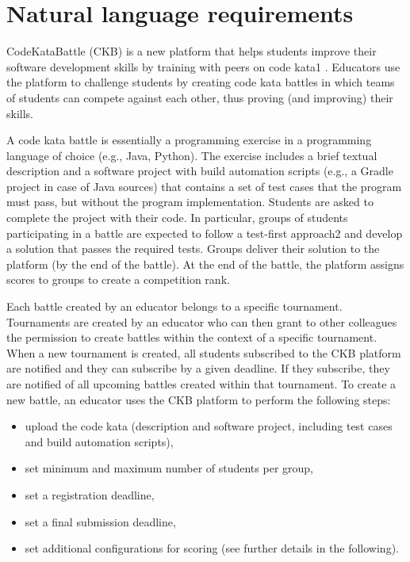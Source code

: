 \section{Natural language requirements}


CodeKataBattle (CKB) is a new platform that helps students improve their software development skills by training with peers on code kata1 . Educators use the platform to challenge students by creating code kata battles in which teams of students can compete against each other, thus proving (and improving) their skills. 


A code kata battle is essentially a programming exercise in a programming language of choice (e.g., Java, Python). The exercise includes a brief textual description and a software project with build automation scripts (e.g., a Gradle project in case of Java sources) that contains a set of test cases that the program must pass, but without the program implementation. Students are asked to complete the project with their code. In particular, groups of students participating in a battle are expected to follow a test-first approach2 and develop a solution that passes the required tests. Groups deliver their solution to the platform (by the end of the battle). At the end of the battle, the platform assigns scores to groups to create a competition rank. 


Each battle created by an educator belongs to a specific tournament. Tournaments are created by an educator who can then grant to other colleagues the permission to create battles within the context of a specific tournament. When a new tournament is created, all students subscribed to the CKB platform are notified and they can subscribe by a given deadline. If they subscribe, they are notified of all upcoming battles created within that tournament. To create a new battle, an educator uses the CKB platform to perform the following steps: 
\begin{itemize}
    \item upload the code kata (description and software project, including test cases and build automation scripts), 
    \item set minimum and maximum number of students per group, 
    \item set a registration deadline, 
    \item set a final submission deadline,
    \item set additional configurations for scoring (see further details in the following). 
\end{itemize}


